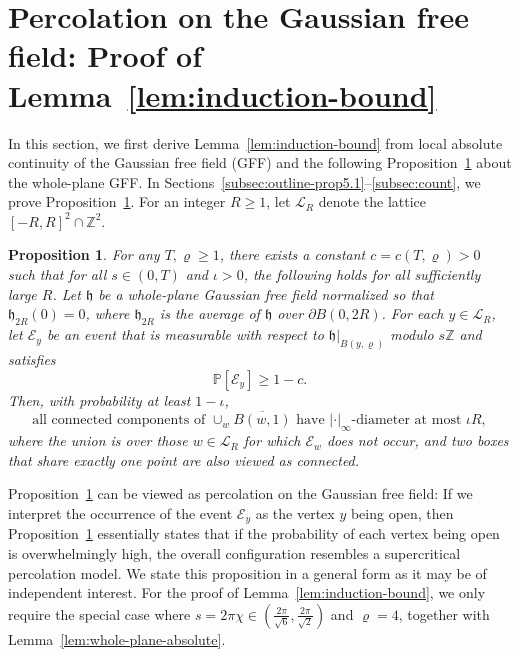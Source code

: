 \documentclass[a4paper]{article}
\numberwithin{equation}{section}
\newtheorem{proposition}[theorem]{Proposition}
\numberwithin{equation}{section}
\renewcommand{\1}{\mathbf{1}}
\begin{document}
\section{Percolation on the Gaussian free field: Proof of Lemma~\ref{lem:induction-bound}}\label{sec:GFF}

In this section, we first derive Lemma~\ref{lem:induction-bound} from local absolute continuity of the Gaussian free field (GFF) and the following Proposition~\ref{prop:whole-GFF} about the whole-plane GFF. In Sections~\ref{subsec:outline-prop5.1}--\ref{subsec:count}, we prove Proposition~\ref{prop:whole-GFF}. For an integer $R \geq 1$, let $\mathscr{L}_R$ denote the lattice $[-R, R]^2 \cap \mathbb{Z}^2$.

\begin{proposition}\label{prop:whole-GFF}
    For any $T,\varrho\geq 1$, there exists a constant $c = c(T,\varrho)>0$ such that for all $s \in (0,T)$ and $\iota>0$, the following holds for all sufficiently large $R$. Let $\mathfrak h$ be a whole-plane Gaussian free field normalized so that $\mathfrak h_{2R}(0) = 0$, where $\mathfrak h_{2R}$ is the average of $\mathfrak h$ over $\partial B(0, 2R)$. For each $y \in \mathscr L_R$, let $\mathcal{E}_y$ be an event that is measurable with respect to $\mathfrak h|_{B(y, \varrho)}$ modulo $s \mathbb{Z}$ and satisfies
    \begin{equation}\label{eq:prop5.1-1}
    \mathbb{P}[\mathcal{E}_y] \geq 1 - c.
    \end{equation}
    Then, with probability at least $1-\iota$, 
    \begin{equation}\label{eq:prop5.1-2}
    \mbox{all connected components of } \cup_w \overline{B(w, 1)} \mbox{ have } |\cdot|_\infty \mbox{-diameter at most } \iota R,
    \end{equation}
    where the union is over those $w \in \mathscr{L}_R$ for which $\mathcal{E}_w$ does not occur, and two boxes that share exactly one point are also viewed as connected.
\end{proposition}

Proposition~\ref{prop:whole-GFF} can be viewed as percolation on the Gaussian free field: If we interpret the occurrence of the event $\mathcal E_y$ as the vertex $y$ being open, then Proposition~\ref{prop:whole-GFF} essentially states that if the probability of each vertex being open is overwhelmingly high, the overall configuration resembles a supercritical percolation model. We state this proposition in a general form as it may be of independent interest. For the proof of Lemma~\ref{lem:induction-bound}, we only require the special case where $s=2\pi\chi \in (\frac{2\pi}{\sqrt{6}},\frac{2\pi}{\sqrt{2}})$ and $\varrho=4$, together with Lemma~\ref{lem:whole-plane-absolute}.
\end{document}
